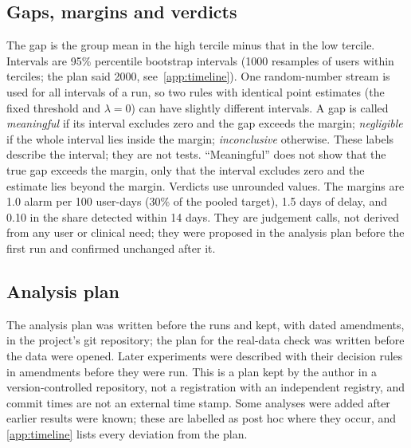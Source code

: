 \documentclass[11pt,a4paper]{article}
\begin{document}
\subsection{Gaps, margins and verdicts}
The gap is the group mean in the high tercile minus that in the low tercile. Intervals are 95\% percentile bootstrap intervals (1000 resamples of users within terciles; the plan said 2000, see~\cref{app:timeline}). One random-number stream is used for all intervals of a run, so two rules with identical point estimates (the fixed threshold and $\lambda=0$) can have slightly different intervals.
A gap is called \emph{meaningful} if its interval excludes zero and the gap exceeds the margin; \emph{negligible} if the whole interval lies inside the margin; \emph{inconclusive} otherwise. These labels describe the interval; they are not tests. ``Meaningful'' does not show that the true gap exceeds the margin, only that the interval excludes zero and the estimate lies beyond the margin. Verdicts use unrounded values. The margins are 1.0 alarm per 100 user-days (30\% of the pooled target), 1.5 days of delay, and 0.10 in the share detected within 14 days. They are judgement calls, not derived from any user or clinical need; they were proposed in the analysis plan before the first run and confirmed unchanged after it.

\subsection{Analysis plan}\label{sec:plan}
The analysis plan was written before the runs and kept, with dated amendments, in the project's git repository; the plan for the real-data check was written before the data were opened. Later experiments were described with their decision rules in amendments before they were run. This is a plan kept by the author in a version-controlled repository, not a registration with an independent registry, and commit times are not an external time stamp. Some analyses were added after earlier results were known; these are labelled as post hoc where they occur, and \cref{app:timeline} lists every deviation from the plan.
\end{document}
